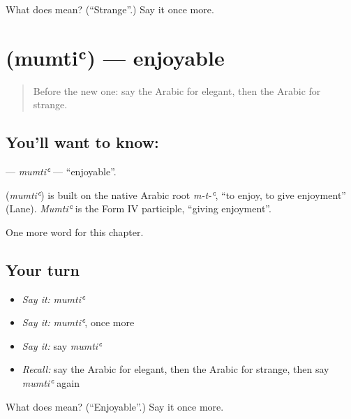 \begin{tcolorbox}[breakable,colback=teal!4,colframe=teal!35!black,title={Before you move on}]
What does  mean? (\textquotedblleft{}Strange\textquotedblright{}.) Say it once more.
\end{tcolorbox}
\section[\texorpdfstring{\ar{ممتع} (mumtiʿ)}{ممتع (mumtiʿ)}]{ (mumtiʿ) — enjoyable}

\label{lesson:AR-C149-mumti}



\begin{quote}
Before the new one: say the Arabic for elegant, then the Arabic for strange.
\end{quote}

\subsection*{You'll want to know: }
\textbf{} — \emph{mumtiʿ} — \textquotedblleft{}enjoyable\textquotedblright{}.

\begin{cousinweb}
\textbf{} (\emph{mumtiʿ}) is built on the native Arabic root \emph{m-t-ʿ}, \textquotedblleft{}to enjoy, to give enjoyment\textquotedblright{} (Lane). \emph{Mumtiʿ} is the Form IV participle, \textquotedblleft{}giving enjoyment\textquotedblright{}.
\end{cousinweb}

\begin{grammarlens}[title={What you've built}]
One more word for this chapter.
\end{grammarlens}

\subsection*{Your turn}
\begin{itemize}
\raggedright
  \item \emph{Say it:} \emph{mumtiʿ}
  \item \emph{Say it:} \emph{mumtiʿ}, once more
  \item \emph{Say it:} say \emph{mumtiʿ}
  \item \emph{Recall:} say the Arabic for elegant, then the Arabic for strange, then say \emph{mumtiʿ} again
\end{itemize}

\begin{tcolorbox}[breakable,colback=teal!4,colframe=teal!35!black,title={Before you move on}]
What does  mean? (\textquotedblleft{}Enjoyable\textquotedblright{}.) Say it once more.
\end{tcolorbox}
